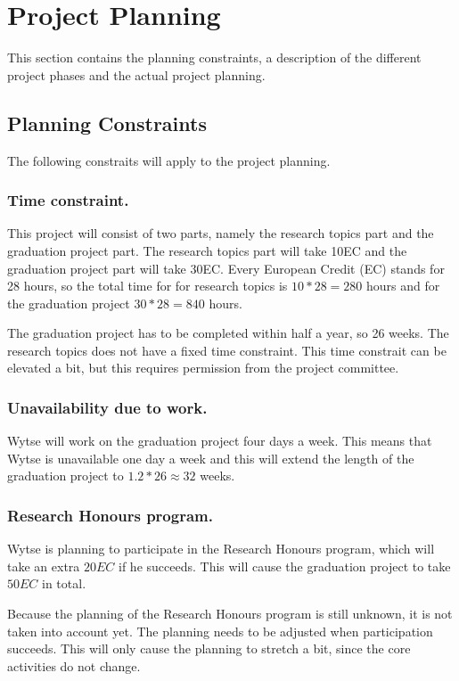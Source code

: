 \chapter{Project Planning}

This section contains the planning constraints, a description of the different project phases and the actual project planning.

\section{Planning Constraints}
The following constraits will apply to the project planning.

\subsection{Time constraint.}
This project will consist of two parts, namely the research topics part and the graduation project part. The research topics part will take 10EC and the graduation project part will take 30EC. Every European Credit (EC) stands for 28 hours, so the total time for for research topics is $10*28 = 280$ hours and for the graduation project $30 * 28 = 840$ hours.

The graduation project has to be completed within half a year, so 26 weeks. The research topics does not have a fixed time constraint. This time constrait can be elevated a bit, but this requires permission from the project committee. 

\subsection{Unavailability due to work.}
Wytse will work on the graduation project four days a week. This means that Wytse is unavailable one day a week and this will extend the length of the graduation project to $1.2 * 26 \approx 32$ weeks.

\subsection{Research Honours program.}
Wytse is planning to participate in the Research Honours program, which will take an extra $20 EC$ if he succeeds. This will cause the graduation project to take $50 EC$ in total.

Because the planning of the Research Honours program is still unknown, it is not taken into account yet. The planning needs to be adjusted when participation succeeds. This will only cause the planning to stretch a bit, since the core activities do not change.

